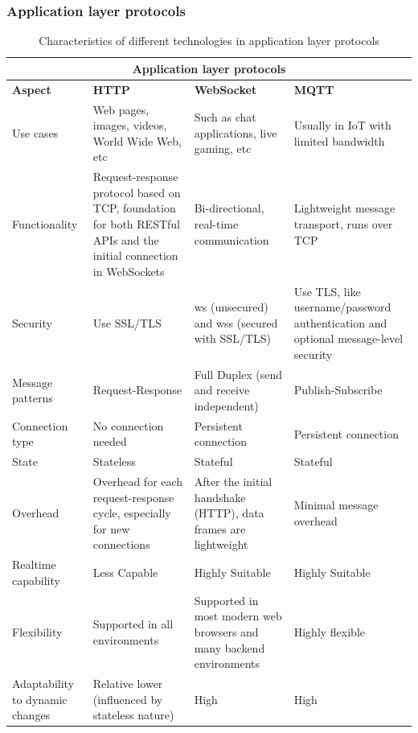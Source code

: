 \subsubsection{Application layer protocols}



\begin{table}
    \small
    \caption{Characteristics of different technologies in application layer protocols}
    \label{tab: applicationlayer}
    \centering
    \begin{tabular}{|m{}|m{}|m{}|m{}|}
    \hline
    \multicolumn{4}{|c|}{\textbf{Application layer protocols}} \\ \hline
    \textbf{Aspect} & \textbf{HTTP} & \textbf{WebSocket}  & \textbf{MQTT} \\ \hline
    Use cases & Web pages, images, videos, World Wide Web, etc & Such as chat applications, live gaming, etc & Usually in IoT with limited bandwidth \\ \hline
    Functionality & Request-response protocol based on TCP, foundation for both RESTful APIs and the initial connection in WebSockets & Bi-directional, real-time communication & Lightweight message transport, runs over TCP \\ \hline
    Security & Use SSL/TLS & ws (unsecured) and wss (secured with SSL/TLS) & Use TLS, like username/password authentication and optional message-level security \\ \hline
    Message patterns & Request-Response & Full Duplex (send and receive independent) & Publish-Subscribe \\ \hline
    Connection type & No connection needed & Persistent {connection} & Persistent connection \\ \hline
    State & Stateless & Stateful & Stateful \\ \hline
    Overhead & Overhead for each request-response cycle, especially for new connections & After the initial handshake (HTTP), data frames are lightweight & Minimal message overhead \\ \hline
    Realtime capability & Less Capable & Highly Suitable & Highly Suitable \\ \hline
    Flexibility & Supported in all environments & Supported in most modern web browsers and many backend environments & Highly flexible \\ \hline
    Adaptability to dynamic changes & Relative lower (influenced by stateless nature) & High & High \\ \hline

\end{tabular}
\end{table}

